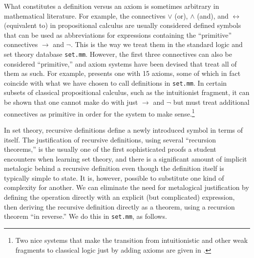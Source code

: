 What constitutes a definition versus an axiom is sometimes arbitrary in mathematical
literature.  For example, the connectives $\vee$ ({\sc or}), $\wedge$
({\sc and}), and $\leftrightarrow$ (equivalent to) in propositional
calculus are usually considered defined symbols that can be used as
abbreviations for expressions containing the ``primitive'' connectives
$\rightarrow$ and $\neg$.  This is the way we treat them in the standard
logic and set theory database \texttt{set.mm}\index{set theory database
(\texttt{set.mm})}.  However, the first three connectives can also be
considered ``primitive,'' and axiom systems have been devised that treat
all of them as such.  For example,
\cite[p.~35]{Goodstein} presents one with 15
axioms, some of which in fact coincide with what we have chosen to call
definitions in \texttt{set.mm}.  In certain subsets of classical
propositional calculus, such as the intuitionist
fragment, it can be shown that one cannot make do
with just $\rightarrow$ and $\neg$ but must treat additional connectives
as primitive in order for the system to make sense.\footnote{Two nice
systems that make the transition from intuitionistic and other weak
fragments to classical logic just by adding axioms are given in
\cite{Robinsont}.}

In set theory, recursive definitions define a newly introduced symbol in
terms of itself.  The justification of recursive definitions, using
several ``recursion theorems,'' is the usually one of the first
sophisticated proofs a student encounters when learning set theory, and
there is a significant amount of implicit metalogic behind a recursive
definition even though the definition itself is typically simple to
state.  It is, however, possible to substitute one kind of complexity
for another.  We can eliminate the need for metalogical justification by
defining the operation directly with an explicit (but complicated)
expression, then deriving the recursive definition directly as a
theorem, using a recursion theorem ``in reverse.''  We do this in
\texttt{set.mm}, as follows.

